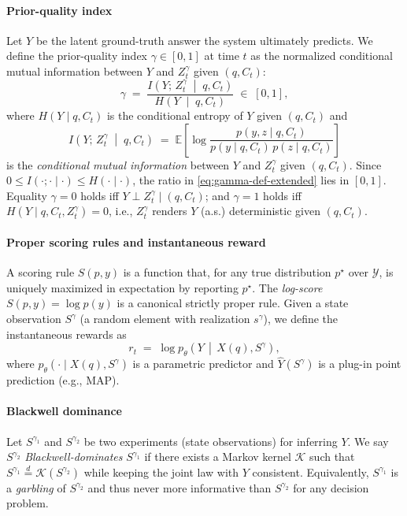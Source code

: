 \documentclass[preprint,12pt]{elsarticle}
\def\textit#1{#1}%
\begin{document}
\paragraph{Prior-quality index}
Let $Y$ be the latent ground-truth answer the system ultimately predicts.
We define the prior-quality index $\gamma\in[0,1]$ at time $t$ as the normalized conditional mutual information
between $Y$ and $Z_t^\gamma$ given $(q,C_t)$:
\begin{equation}
\gamma
\;=\;
\frac{I\!\left(Y;\,Z_t^\gamma\;\middle|\;q,C_t\right)}
     {H\!\left(Y\;\middle|\;q,C_t\right)}
\;\in\;[0,1],
\label{eq:gamma-def-extended}
\end{equation}
\textit{where} $H(Y\mid q,C_t)$ is the conditional entropy of $Y$ given $(q,C_t)$ and
\begin{equation}
I\!\left(Y;\,Z_t^\gamma\;\middle|\;q,C_t\right)
\;=\;
\mathbb{E}\!\left[
\log\frac{p(y,z\mid q,C_t)}{p(y\mid q,C_t)\,p(z\mid q,C_t)}
\right]
\label{eq:cond-mi}
\end{equation}
is the \emph{conditional mutual information} between $Y$ and $Z_t^\gamma$ given $(q,C_t)$.
Since $0\le I(\cdot;\cdot\mid\cdot)\le H(\cdot\mid\cdot)$, the ratio in \eqref{eq:gamma-def-extended} lies in $[0,1]$.
Equality $\gamma=0$ holds iff $Y\perp Z_t^\gamma\mid(q,C_t)$; and $\gamma=1$ holds iff
$H(Y\mid q,C_t,Z_t^\gamma)=0$, i.e., $Z_t^\gamma$ renders $Y$ (a.s.) deterministic given $(q,C_t)$.

\paragraph{Proper scoring rules and instantaneous reward}
A scoring rule $S(p,y)$ is a function that, for any true distribution $p^\star$ over $\mathcal{Y}$,
is uniquely maximized in expectation by reporting $p^\star$.
The \emph{log-score} $S(p,y)=\log p(y)$ is a canonical strictly proper rule.
Given a state observation $S^\gamma$ (a random element with realization $s^\gamma$),
we define the instantaneous rewards as
\begin{equation}
r_t \;=\; \log p_\theta\!\left(Y \,\middle|\, X(q), S^\gamma\right)
,
\label{eq:reward-examples}
\end{equation}
\textit{where} $p_\theta(\cdot\mid X(q),S^\gamma)$ is a parametric predictor
and $\hat{Y}(S^\gamma)$ is a plug-in point prediction (e.g., MAP).

\paragraph{Blackwell dominance}
Let $S^{\gamma_1}$ and $S^{\gamma_2}$ be two experiments (state observations) for inferring $Y$.
We say $S^{\gamma_2}$ \emph{Blackwell-dominates} $S^{\gamma_1}$ if there exists a Markov kernel
$\mathcal{K}$ such that $S^{\gamma_1}\stackrel{d}{=}\mathcal{K}(S^{\gamma_2})$ while keeping the joint law with $Y$ consistent.
Equivalently, $S^{\gamma_1}$ is a \emph{garbling} of $S^{\gamma_2}$ and thus never more informative than $S^{\gamma_2}$ for any decision problem.
\end{document}
